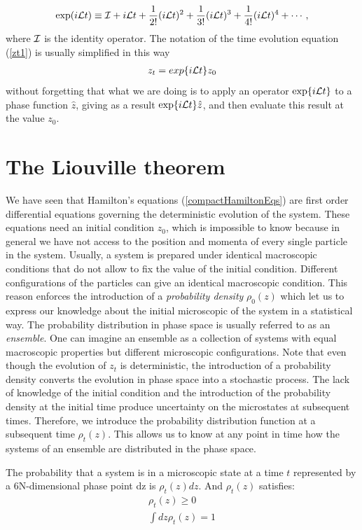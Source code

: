 \documentclass[b5paper,openright,11pt]{book}
\begin{document}
\begin{align}
  {\rm exp}(i{\cal L}t) \equiv {\cal I} + i{\cal L}t + \frac{1}{2!}(i{\cal L}t)^2 + \frac{1}{3!}(i{\cal L}t)^3 +  \frac{1}{4!}(i{\cal L}t)^4 + \cdots,
\end{align}
where ${\cal I}$ is the identity operator.
The notation of the time evolution equation (\ref{zt1}) is usually simplified in this way 
\begin{align}
  z_t = exp\{i{\cal L}t\}z_0
  \label{zt}
\end{align}
without forgetting that what we are doing is to apply an operator ${\rm exp}\{i{\cal L}t\}$ to a phase function $\hat{z}$, giving as a result ${\rm exp}\{i{\cal L}t\}\hat{z}$, and then evaluate this result at the value $z_0$.


\section{The Liouville theorem}
We have seen that Hamilton's equations (\ref{compactHamiltonEqs}) are first order differential equations governing the deterministic evolution of the system. 
These equations need an initial condition $z_0$, which is impossible to know because in general we have not access to the position and momenta of every single particle in the system. Usually, a system is prepared under identical macroscopic conditions that do not allow to fix the value of the initial condition. 
Different configurations of the particles can give an identical macroscopic condition. 
This reason enforces the introduction of a {\it probability density} $\rho_0(z)$ which let us to express our knowledge about the initial microscopic of the system in a statistical way. The probability distribution in phase space is usually referred to as an {\it ensemble}. One can imagine an ensemble as a collection of systems with equal macroscopic properties but different microscopic configurations.
Note that even though the evolution of $z_t$ is deterministic, the introduction of a probability density converts the evolution in phase space into a stochastic process.
The lack of knowledge of the initial condition and the introduction of the probability density at the initial time produce uncertainty on the microstates at subsequent times. Therefore, we introduce the probability distribution function at a subsequent time $\rho_t(z)$.
This allows us to know at any point in time how the systems of an ensemble are distributed in the phase space.

The probability that a system is in a microscopic state at a time $t$ represented by a 6N-dimensional phase point dz is $\rho_t(z)dz$. And $\rho_t(z)$ satisfies:
\begin{align}
    \rho_t(z) \geq 0  \nonumber \\
    \int dz\rho_t(z) = 1
\end{align}
\end{document}
